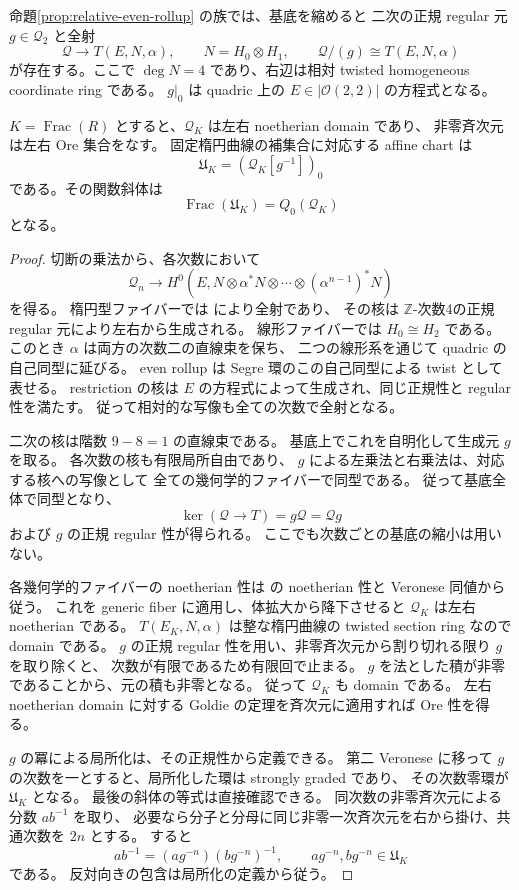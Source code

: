 \begin{proposition}\label{prop:relative-elliptic-chart}
命題\ref{prop:relative-even-rollup} の族では、基底を縮めると
二次の正規 regular 元 $g\in\mathcal Q_2$ と全射
\[
 \mathcal Q\longrightarrow T(E,N,\alpha),\qquad N=H_0\otimes H_1,
 \qquad \mathcal Q/(g)\cong T(E,N,\alpha)
\]
が存在する。ここで $\deg N=4$ であり、右辺は相対 twisted homogeneous coordinate ring である。
$g|_0$ は quadric 上の $E\in|\mathcal O(2,2)|$ の方程式となる。

$K=\operatorname{Frac}(R)$ とすると、$\mathcal Q_K$ は左右 noetherian domain であり、
非零斉次元は左右 Ore 集合をなす。
固定楕円曲線の補集合に対応する affine chart は
\[
 \mathfrak U_K=(\mathcal Q_K[g^{-1}])_0
\]
である。その関数斜体は
\[
 \operatorname{Frac}(\mathfrak U_K)=Q_0(\mathcal Q_K)
\]
となる。
\end{proposition}

\begin{proof}
切断の乗法から、各次数において
\[
 \mathcal Q_n\longrightarrow
 H^0\!\left(E,N\otimes\alpha^*N\otimes\cdots
                    \otimes(\alpha^{n-1})^*N\right)
\]
を得る。
楕円型ファイバーでは \cite[定理5.5.6]{VdBQuadrics} により全射であり、
その核は $\mathbb Z$-次数4の正規 regular 元により左右から生成される。
線形ファイバーでは $H_0\cong H_2$ である。
このとき $\alpha$ は両方の次数二の直線束を保ち、
二つの線形系を通じて quadric の自己同型に延びる。
even rollup は Segre 環のこの自己同型による twist として表せる。
restriction の核は $E$ の方程式によって生成され、同じ正規性と regular 性を満たす。
従って相対的な写像も全ての次数で全射となる。

二次の核は階数 $9-8=1$ の直線束である。
基底上でこれを自明化して生成元 $g$ を取る。
各次数の核も有限局所自由であり、
$g$ による左乗法と右乗法は、対応する核への写像として
全ての幾何学的ファイバーで同型である。
従って基底全体で同型となり、
\[
 \ker(\mathcal Q\longrightarrow T)=g\mathcal Q=\mathcal Qg
\]
および $g$ の正規 regular 性が得られる。
ここでも次数ごとの基底の縮小は用いない。

各幾何学的ファイバーの noetherian 性は
\cite[系5.5.9、補題3.5]{VdBQuadrics} の noetherian 性と Veronese 同値から従う。
これを generic fiber に適用し、体拡大から降下させると
$\mathcal Q_K$ は左右 noetherian である。
$T(E_K,N,\alpha)$ は整な楕円曲線の twisted section ring なので domain である。
$g$ の正規 regular 性を用い、非零斉次元から割り切れる限り $g$ を取り除くと、
次数が有限であるため有限回で止まる。
$g$ を法とした積が非零であることから、元の積も非零となる。
従って $\mathcal Q_K$ も domain である。
左右 noetherian domain に対する Goldie の定理を斉次元に適用すれば Ore 性を得る。

$g$ の冪による局所化は、その正規性から定義できる。
第二 Veronese に移って $g$ の次数を一とすると、局所化した環は strongly graded であり、
その次数零環が $\mathfrak U_K$ となる。
最後の斜体の等式は直接確認できる。
同次数の非零斉次元による分数 $ab^{-1}$ を取り、
必要なら分子と分母に同じ非零一次斉次元を右から掛け、共通次数を $2n$ とする。
すると
\[
 ab^{-1}=(ag^{-n})(bg^{-n})^{-1},\qquad
 ag^{-n},bg^{-n}\in\mathfrak U_K
\]
である。
反対向きの包含は局所化の定義から従う。
\end{proof}

